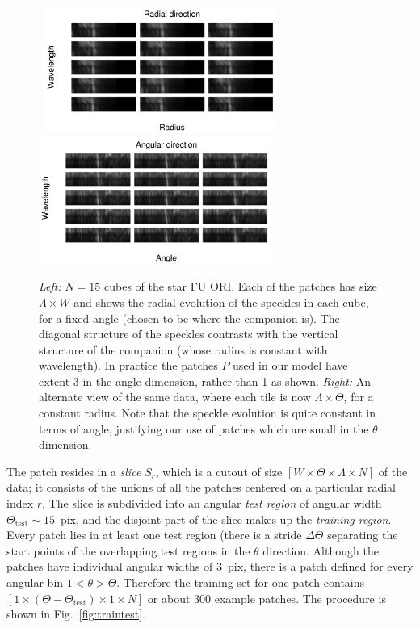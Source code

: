 \documentclass[12pt,pdftex,preprint]{aastex}
\newcommand{\test}{\mathrm{test}}
\newcommand{\fig}[1]{Fig.\ \ref{fig:#1}}
\begin{document}
\begin{figure}[h!]
\begin{center}
\mbox{
\includegraphics[width=3.0in]{figs/radius.pdf}
\hspace{5mm}
\includegraphics[width=3.0in]{figs/theta.pdf}
}
\end{center}
\vspace{-7mm}
\caption{{\em Left:} $N=15$ cubes of the star FU ORI. Each of the
  patches has size $\Lambda \times W$ and shows the radial evolution
  of the speckles in each cube, for a fixed angle (chosen to be where
  the companion is). The diagonal structure of the speckles contrasts
  with the vertical structure of the companion (whose radius is
  constant with wavelength). In practice the patches $P$ used in our
  model have extent 3 in the angle dimension, rather than 1 as
  shown. {\em Right:} An alternate view of the same data, where each
  tile is now $\Lambda \times \Theta$, for a constant radius. Note
  that the speckle evolution is quite constant in terms of angle,
  justifying our use of patches which are small in the $\theta$
  dimension. }
\label{fig:radiustheta}
\end{figure}


The patch resides in a \emph{slice} $S_r$, which is a cutout of size
$[W\times\Theta\times\Lambda\times N]$ of the data; it consists of the
unions of all the patches centered on a particular radial index $r$.
The slice is subdivided into an angular \emph{test region} of angular
width $\Theta_\test\sim 15$~pix, and the disjoint part of the slice
makes up the \emph{training region}.  Every patch lies in at least one
test region (there is a stride $\Delta\Theta$ separating the start
points of the overlapping test regions in the $\theta$ direction.
Although the patches have individual angular widths of 3~pix, there is
a patch defined for every angular bin $1 < \theta > \Theta$.
Therefore the training set for one patch contains
$[1\times(\Theta-\Theta_\test)\times 1\times N]$ or about 300 example
patches. The procedure is shown in \fig{traintest}.
\end{document}
